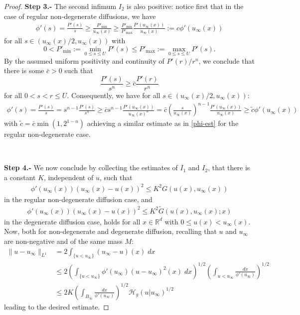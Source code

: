 \documentclass[10pt,a4paper]{amsart}
\newcommand{\R}{\mathbb{R}}
\newcommand{\uinf}{u_\infty}
\begin{document}
\begin{proof}
{\bf Step 3.-}
The second infimum $I_2$ is also positive: notice first that in the case of regular non-degenerate diffusions, we have
    \begin{align}\label{phi-est}
        \phi'(s) = \frac{P'(s)}{s} 
        \ge \frac{P'_\text{min}}{\uinf(x)} 
        \geq \frac{P'_\text{min}}{P'_{\text{max}}}  \frac{P'(\uinf(x))}{\uinf(x)}:= c\phi'(\uinf(x))
    \end{align}
for all $s\in(\uinf(x)/2,\uinf(x))$ with 
\[
    0<P'_\text{min} :=\min_{0\leq s\leq U} P'(s) \le P'_{\text{max}}:=\max_{0\leq s\leq U} P'(s). 
\]
By the assumed uniform positivity and continuity of $P'(r)/r^n$, 
we conclude that there is some $\bar c>0$ such that 
\[ 
    \frac{P'(s)}{s^n} \ge \bar c \frac{P'(r)}{r^n} 
\]
for all $0<s<r\le U$. Consequently,  we have for all $s\in(\uinf(x)/2,\uinf(x))$:
    \begin{align*}
        \phi'(s) = \frac{P'(s)}{s} 
        = s^{n-1}\frac{P'(s)}{s^n} 
        \ge \bar c s^{n-1}\frac{P'(\uinf(x))}{\uinf(x)^n}
        = \bar c\left(\frac{s}{\uinf(x)}\right)^{n-1}\frac{P'(\uinf(x))}{\uinf(x)}
        \ge \tilde c \phi'(\uinf(x))\,
    \end{align*}
with $\tilde{c}=\bar c\min(1,2^{1-n})$ achieving a similar estimate as in \eqref{phi-est} for the regular non-degenerate case.

\

{\bf Step 4.-} We now conclude by collecting the estimates of $I_1$ and $I_2$, that there is a constant $K$, independent of $u$, such that
 \begin{align*}
        \phi'(\uinf(x))(\uinf(x)-u(x))^2 \le K^2  G(u(x),\uinf(x))
    \end{align*}
in the regular non-degenerate diffusion case, and 
    \begin{align*}
        \phi'(\uinf(x))(\uinf(x)-u(x))^2 \le K^2 \tilde G(u(x),\uinf(x);x)
    \end{align*}
in the degenerate diffusion case, 
holds for all $x\in\R^d$ with $0\leq u(x)<\uinf(x)$. Now, both for non-degenerate and degenerate diffusion, recalling that $u$ and $u_\infty$ are non-negative and of the same mass $M$:
    \begin{align*}
        \|u-\uinf\|_{L^1} 
        &= 2\int_{\{u<\uinf\}} (\uinf-u)(x)\;dx \\
        & \le 2\left(\int_{\{u<\uinf\}}\phi'(\uinf)(u-\uinf)^2(x)\;dx\right)^{1/2}\left(\int_{u<\uinf}\frac{dx}{\phi'(\uinf)}\right)^{1/2} \\
        &\le 2K\left(\int_{B_\infty}\frac{dx}{\phi'(\uinf)}\right)^{1/2}\mathcal H_g(u|\uinf)^{1/2}
    \end{align*} 
leading to the desired estimate.


\end{proof}
\end{document}
